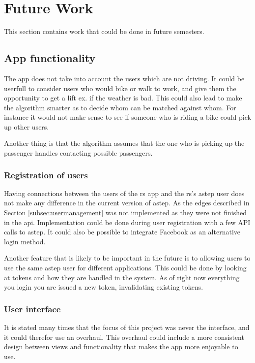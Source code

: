 \section{Future Work}\label{sec:future}
This section contains work that could be done in future semesters.

\subsection{App functionality}
The app does not take into account the users which are not driving.
It could be userfull to consider users who would bike or walk to work, and give them the opportunity to get a lift ex. if the weather is bad.
This could also lead to make the algorithm smarter as to decide whom can be matched against whom.
For instance it would not make sense to see if someone who is riding a bike could pick up other users.

Another thing is that the algorithm assumes that the one who is picking up the passenger handles contacting possible passengers.

\subsubsection*{Registration of users}
Having connections between the users of the \gls{rs} app and the \gls{rs}'s \gls{astep} user does not make any difference in the current version of \gls{astep}.
As the edges described in Section \ref{subsec:usermanagement} was not implemented as they were not finished in the api.
Implementation could be done during user registration with a few API calls to \gls{astep}.
It could also be possible to integrate Facebook as an alternative login method.

Another feature that is likely to be important in the future is to allowing users to use the same \gls{astep} user for different applications.
This could be done by looking at tokens and how they are handled in the  system.
As of right now everything you login you are issued a new token, invalidating existing tokens.

\subsubsection*{User interface}
It is stated many times that the focus of this project was never the interface, and it could therefor use an overhaul.
This overhaul could include a more consistent design between views and functionality that makes the app more enjoyable to use.

